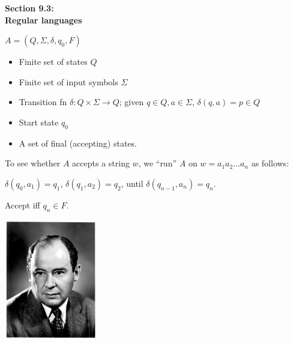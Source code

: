 
\newcommand{\mytitle}{Computational Foundations: Regular Languages}
\newcommand{\mychpnr}{9}


\begin{frame}
\begin{center}
\addtocounter{part}{1}
{\bf Section 9.3: \\ Regular languages}
\end{center}
\end{frame}

\begin{frame}

$A=(Q,\Sigma,\delta,q_0,F)$

\begin{itemize}
\item  Finite set of states $Q$
\item  Finite set of input symbols $\Sigma$
\item  Transition fn $\delta:Q\times\Sigma\longrightarrow Q$;
given $q\in Q,a\in\Sigma$, $\delta(q,a)=p\in Q$ 
\item  Start state $q_0$
\item  A set of final (accepting) states.
\end{itemize}

To see whether $A$ accepts a string
$w$, we ``run'' $A$ on $w=a_1a_2\ldots a_n$ as follows:

$\delta(q_0,a_1)=q_1$, $\delta(q_1,a_2)=q_2$, until
$\delta(q_{n-1},a_n)=q_n$.  

Accept iff $q_n\in F$.
\end{frame}

\begin{frame}
\begin{minipage}{5cm}
\includegraphics[width=4cm]{figures/JohnvonNeumann.jpg}
\end{minipage}
\begin{minipage}{5cm}
 \\
\end{minipage}
\end{frame}


